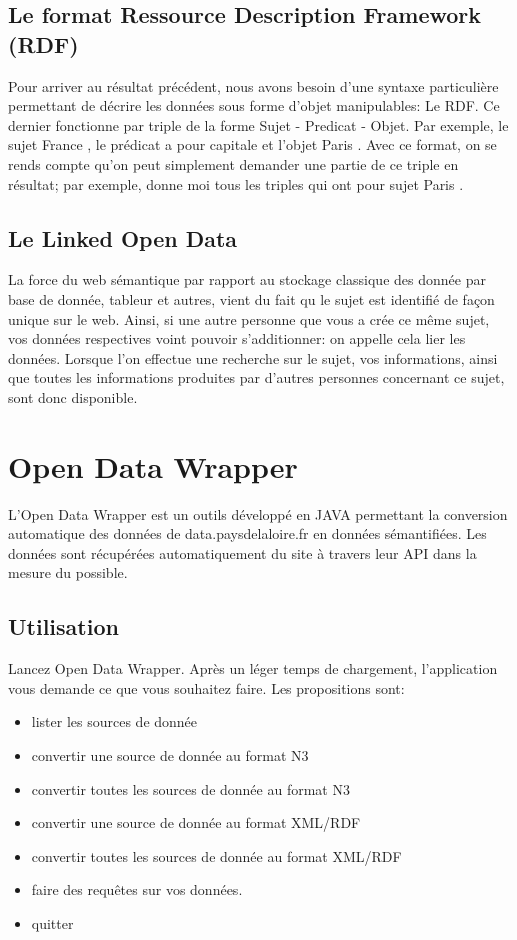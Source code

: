 \documentclass[a4paper]{article}
\begin{document}
\subsection{Le format Ressource Description Framework (RDF)}

Pour arriver au résultat précédent, nous avons besoin d'une syntaxe particulière
permettant de décrire les données sous forme d'objet manipulables: Le RDF. Ce
dernier fonctionne par triple de la forme Sujet - Predicat - Objet. Par exemple,
le sujet \og{} France \fg{} , le prédicat \og{} a pour capitale \fg{} et l'objet
\og{} Paris \fg{}. Avec ce format, on se rends compte qu'on peut simplement
demander une partie de ce triple en résultat; par exemple, donne moi tous les
triples qui ont pour sujet \og{} Paris \fg{}.


\subsection{Le Linked Open Data}

La force du web sémantique par rapport au stockage classique des donnée par base
de donnée, tableur et autres, vient du fait qu le sujet est identifié de façon
unique sur le web. Ainsi, si une autre personne que vous a crée ce même sujet,
vos données respectives voint pouvoir s'additionner: on appelle cela lier les
données. Lorsque l'on effectue une recherche sur le sujet, vos informations,
ainsi que toutes les informations produites par d'autres personnes concernant ce
sujet, sont donc disponible.

\section{Open Data Wrapper}

L'Open Data Wrapper est un outils développé en JAVA permettant la conversion
automatique des données de data.paysdelaloire.fr en données sémantifiées. Les
données sont récupérées automatiquement du site à travers leur API dans la
mesure du possible.

\subsection{Utilisation}

Lancez Open Data Wrapper. Après un léger temps de chargement, l'application vous
demande ce que vous souhaitez faire. Les propositions sont:
\begin{itemize}
\item lister les sources de donnée
\item convertir une source de donnée au format N3
\item convertir toutes les sources de donnée au format N3
\item convertir une source de donnée au format XML/RDF
\item convertir toutes les sources de donnée au format XML/RDF
\item faire des requêtes sur vos données.
\item quitter
\end{itemize}
\end{document}
